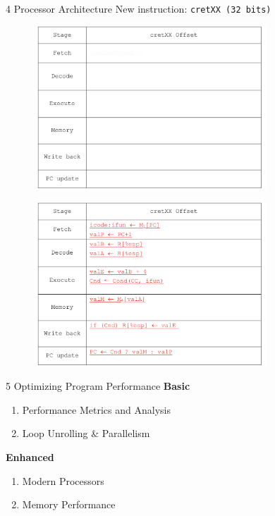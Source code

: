 \documentclass{beamer}
\begin{document}
\begin{frame}{4 Processor Architecture}
	New instruction: \texttt{cretXX  (32 bits)}
	\only<1> {
		\begin{figure}
			\centering
			\includegraphics[width=0.78\textwidth]{figures/4-1-1.jpeg}
		\end{figure}
	}
	 {
		\begin{figure}
			\centering
			\includegraphics[width=0.78\textwidth]{figures/4-1-2.jpeg}
		\end{figure}
	}
\end{frame}

\begin{frame}{5 Optimizing Program Performance}
\textbf{Basic}
\begin{enumerate}
	\item Performance Metrics and Analysis
	\item Loop Unrolling \& Parallelism
\end{enumerate}
\textbf{Enhanced}
\begin{enumerate}
	\item Modern Processors
	\item Memory Performance
\end{enumerate}
\end{frame}
\end{document}
